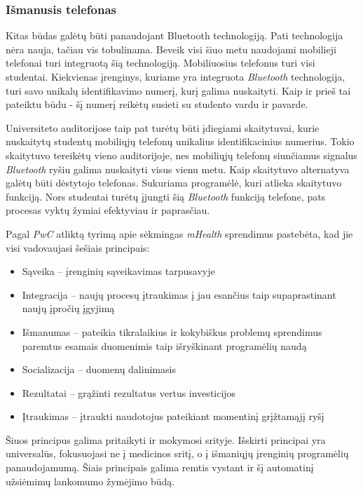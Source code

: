 \documentclass{VUMIFPSbakalaurinis}
\begin{document}
\subsubsection{Išmanusis telefonas}
Kitas būdas galėtų būti panaudojant Bluetooth technologiją. Pati technologija nėra nauja, tačiau vis tobulinama. Beveik visi šiuo metu naudojami mobilieji telefonai turi integruotą šią technologiją. Mobiliuosius telefonus turi visi studentai. Kiekvienas įrenginys, kuriame yra integruota \textit{Bluetooth} technologija, turi savo unikalų identifikavimo numerį, kurį galima nuskaityti. Kaip ir prieš tai pateiktu būdu - šį numerį reikėtų susieti su studento vardu ir pavarde.

Universiteto auditorijose taip pat turėtų būti įdiegiami skaitytuvai, kurie nuskaitytų studentų mobiliųjų telefonų unikalius identifikacinius numerius. Tokio skaitytuvo tereikėtų vieno auditorijoje, nes mobiliųjų telefonų siunčiamus signalus \textit{Bluetooth} ryšiu galima nuskaityti visus vienu metu. Kaip skaitytuvo alternatyva galėtų būti dėstytojo telefonas. Sukuriama programėlė, kuri atlieka skaitytuvo funkciją. Nors studentai turėtų įjungti šią \textit{Bluetooth} funkciją telefone, pats procesas vyktų žymiai efektyviau ir paprasčiau.

Pagal \textit{PwC} atliktą tyrimą apie sėkmingas \textit{mHealth} sprendimus \cite{mhealth} pastebėta, kad jie visi vadovaujasi šešiais principais:

\begin{itemize}
    \item Sąveika – įrenginių sąveikavimas tarpusavyje
    \item Integracija – naujų procesų įtraukimas į jau esančius taip supaprastinant naujų įpročių įgyjimą
    \item Išmanumas – pateikia tikralaikius ir kokybiškus problemų sprendimus paremtus esamais duomenimis taip išryškinant programėlių naudą
    \item Socializacija – duomenų dalinimasis
    \item Rezultatai – grąžinti rezultatus vertus investicijos
    \item Įtraukimas – įtraukti naudotojus pateikiant momentinį grįžtamąjį ryšį
\end{itemize}

Šiuos principus galima pritaikyti ir mokymosi srityje. Išskirti principai yra universalūs, fokusuojasi ne į medicinos sritį, o į išmaniųjų įrenginių programėlių panaudojamumą. Šiais principais galima remtis vystant ir šį automatinį užsiėmimų lankomumo žymėjimo būdą.
\end{document}
